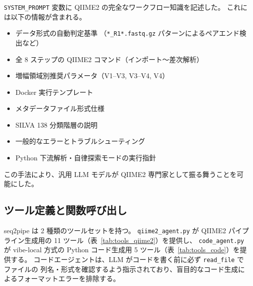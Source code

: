 \documentclass[12pt, a4paper]{article}
\begin{document}
\texttt{SYSTEM\_PROMPT} 変数に QIIME2 の完全なワークフロー知識を記述した。
これには以下の情報が含まれる。

\begin{itemize}
  \item データ形式の自動判定基準
    （\texttt{*\_R1*.fastq.gz} パターンによるペアエンド検出など）
  \item 全 8 ステップの QIIME2 コマンド（インポート〜差次解析）
  \item 増幅領域別推奨パラメータ（V1--V3, V3--V4, V4）
  \item Docker 実行テンプレート
  \item メタデータファイル形式仕様
  \item SILVA 138 分類階層の説明
  \item 一般的なエラーとトラブルシューティング
  \item Python 下流解析・自律探索モードの実行指針
\end{itemize}

この手法により、汎用 LLM モデルが QIIME2 専門家として振る舞うことを可能にした。

\subsection{ツール定義と関数呼び出し}

seq2pipe は 2 種類のツールセットを持つ。
\texttt{qiime2\_agent.py} が QIIME2 パイプライン生成用の 11 ツール（表~\ref{tab:tools_qiime2}）を提供し、
\texttt{code\_agent.py} が vibe-local 方式の Python コード生成用 5 ツール（表~\ref{tab:tools_code}）を提供する。
コードエージェントは、LLM がコードを書く前に必ず \texttt{read\_file} でファイルの
列名・形式を確認するよう指示されており、盲目的なコード生成によるフォーマットエラーを排除する。
\end{document}
